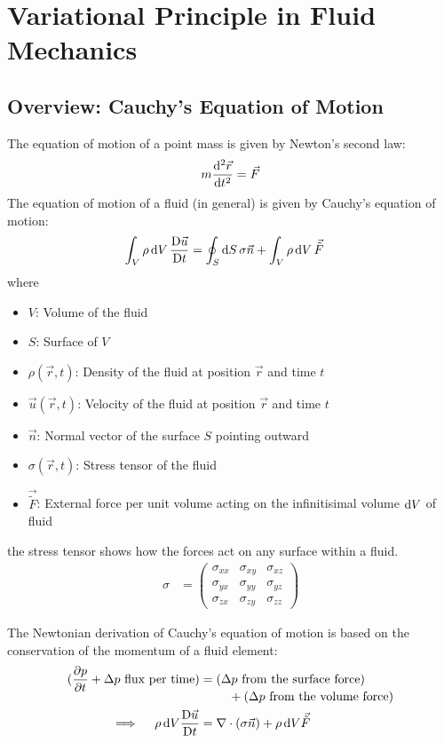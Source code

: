 \newpage
\section{Variational Principle in Fluid Mechanics}
\subsection{Overview: Cauchy's Equation of Motion}
The equation of motion of a point mass is given by Newton's second law:
\begin{align}
  m \odv[2]{\vec{r}}{t} = \vec{F}
\end{align}
The equation of motion of a fluid (in general) is given by Cauchy's equation of motion:
\begin{align}
  \int_V \rho \odif{V} \, \mdv{\vec{u}}{t} & = \oint_S \odif{S} \, \sigma \vec{n}  + \int_V \rho \odif{V} \, \vec{\tilde{F}}
\end{align}
where
\begin{itemize}
  \item $V$: Volume of the fluid
  \item $S$: Surface of $V$
  \item $\rho (\vec{r}, t)$: Density of the fluid at position $\vec{r}$ and time $t$
  \item $\vec{u} (\vec{r}, t)$: Velocity of the fluid at position $\vec{r}$ and time $t$
  \item $\vec{n}$: Normal vector of the surface $S$ pointing outward
  \item $\sigma (\vec{r}, t)$: Stress tensor of the fluid
  \item $\vec{\tilde{F}}$: External force per unit volume acting on the infinitisimal volume $\odif{V}$ of fluid
\end{itemize}
the stress tensor shows how the forces act on any surface within a fluid.
\begin{align}
  \sigma & = \begin{pmatrix}
               \sigma_{xx} & \sigma_{xy} & \sigma_{xz} \\
               \sigma_{yx} & \sigma_{yy} & \sigma_{yz} \\
               \sigma_{zx} & \sigma_{zy} & \sigma_{zz}
             \end{pmatrix}
\end{align}

The Newtonian derivation of Cauchy's equation of motion is based on the conservation of the momentum of a fluid element:
\begin{align}
  (\pdv{p}{t} + \Delta p \text{ flux per time}) & =
  \begin{multlined}[t]
    (\Delta p \text{ from the surface force}) \\
    + (\Delta p \text{ from the volume force})
  \end{multlined}                                                                       \\
  \implies \quad \rho \odif{V} \mdv{\vec{u}}{t} & = \nabla \cdot (\sigma \vec{n}) + \rho \odif{V} \vec{\tilde{F}}
\end{align}



